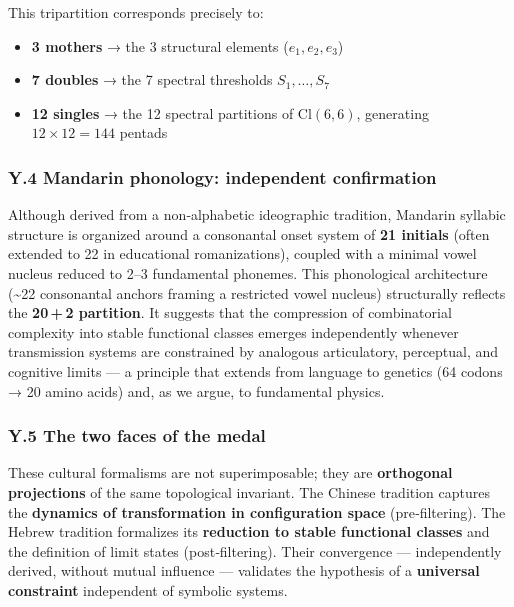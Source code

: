 \documentclass[11pt]{article}
\providecommand{\tightlist}{\setlength{\itemsep}{2pt}\setlength{\parskip}{6pt}}
\providecommand{\tightlist}{%
  \setlength{\itemsep}{2pt}\setlength{\parskip}{6pt}
}
\begin{document}
This tripartition corresponds precisely to:

\begin{itemize}
\tightlist
\item
  \textbf{3 mothers} → the 3 structural elements (\(e_1,e_2,e_3\))
\item
  \textbf{7 doubles} → the 7 spectral thresholds \(S_1,\ldots,S_7\)
\item
  \textbf{12 singles} → the 12 spectral partitions of
  \(\mathrm{Cl}(6,6)\), generating \(12 \times 12 = 144\) pentads
\end{itemize}

\hypertarget{y.4-mandarin-phonology-independent-confirmation}{%
\subsubsection{Y.4 Mandarin phonology: independent
confirmation}\label{y.4-mandarin-phonology-independent-confirmation}}

Although derived from a non‑alphabetic ideographic tradition, Mandarin
syllabic structure is organized around a consonantal onset system of
\textbf{21 initials} (often extended to 22 in educational
romanizations), coupled with a minimal vowel nucleus reduced to 2--3
fundamental phonemes. This phonological architecture (\textasciitilde22
consonantal anchors framing a restricted vowel nucleus) structurally
reflects the \textbf{20\,+\,2 partition}. It suggests that the
compression of combinatorial complexity into stable functional classes
emerges independently whenever transmission systems are constrained by
analogous articulatory, perceptual, and cognitive limits --- a principle
that extends from language to genetics (64 codons → 20 amino acids) and,
as we argue, to fundamental physics.

\hypertarget{y.5-the-two-faces-of-the-medal}{%
\subsubsection{Y.5 The two faces of the
medal}\label{y.5-the-two-faces-of-the-medal}}

These cultural formalisms are not superimposable; they are
\textbf{orthogonal projections} of the same topological invariant. The
Chinese tradition captures the \textbf{dynamics of transformation in
configuration space} (pre‑filtering). The Hebrew tradition formalizes
its \textbf{reduction to stable functional classes} and the definition
of limit states (post‑filtering). Their convergence --- independently
derived, without mutual influence --- validates the hypothesis of a
\textbf{universal constraint} independent of symbolic systems.
\end{document}
